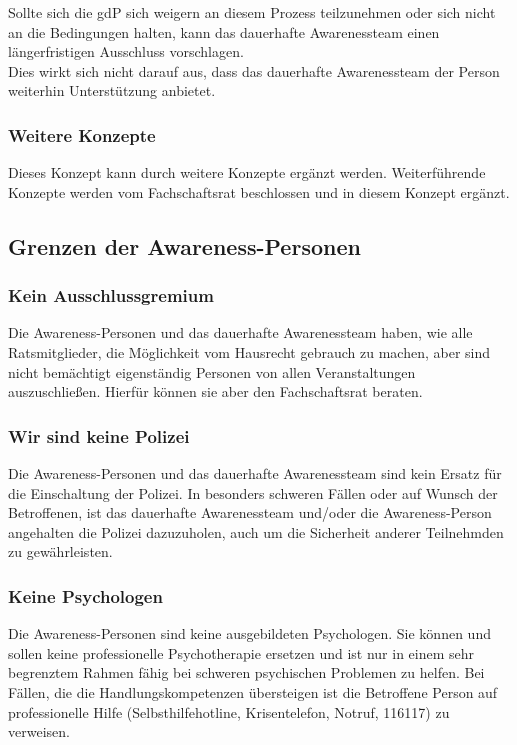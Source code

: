 \documentclass{article}
\begin{document}
Sollte sich die gdP sich weigern an diesem Prozess teilzunehmen oder sich nicht an die Bedingungen halten,
kann das dauerhafte Awarenessteam einen längerfristigen Ausschluss vorschlagen.\\
Dies wirkt sich nicht darauf aus, dass das dauerhafte Awarenessteam der Person weiterhin Unterstüt\-zung anbietet.

\subsubsection{Weitere Konzepte}

Dieses Konzept kann durch weitere Konzepte ergänzt werden. Weiterführende Konzepte werden vom Fachschaftsrat beschlossen und in diesem Konzept ergänzt.

\subsection{Grenzen der Awareness-Personen}

\subsubsection{Kein Ausschlussgremium}
Die Awareness-Personen und das dauerhafte Awarenessteam haben, wie alle Ratsmitglieder, die Mög\-lich\-keit vom Hausrecht gebrauch zu machen, aber sind nicht bemächtigt 
eigenständig Personen von allen Veranstaltungen auszuschließen. Hierfür können sie aber den Fachschaftsrat beraten.

\subsubsection{Wir sind keine Polizei}
Die Awareness-Personen und das dauerhafte Awarenessteam sind kein Ersatz für die Einschaltung der Polizei. In besonders schweren Fällen oder auf Wunsch der Betroffenen, ist 
das dauerhafte Awarenessteam und/oder die Awareness-Person angehalten die Polizei dazuzuholen, auch um die Sicherheit anderer Teilnehmden zu gewährleisten.

\subsubsection{Keine Psychologen}
Die Awareness-Personen sind keine ausgebildeten Psychologen. Sie können und sollen keine professionelle Psychotherapie ersetzen und ist nur in einem sehr begrenztem Rahmen 
fähig bei schweren psychischen Problemen zu helfen. Bei Fällen, die die Handlungskompetenzen übersteigen ist die Betroffene Person auf professionelle Hilfe 
(Selbsthilfehotline, Krisentelefon, Notruf, 116117) zu verweisen. 
\end{document}
